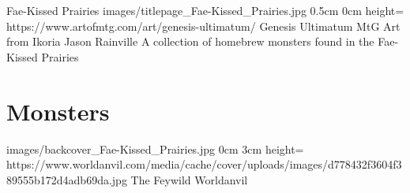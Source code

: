 \documentclass[letterpaper,openany,twoside,twocolumn]{book}
\begin{document}
	\bookTitlePage
		{Fae-Kissed Prairies}
		{images/titlepage_Fae-Kissed_Prairies.jpg}
		{0.5cm}
		{0cm}
		{height=\paperheight}
		{https://www.artofmtg.com/art/genesis-ultimatum/}
		{Genesis Ultimatum MtG Art from Ikoria}
		{Jason Rainville}
		{A collection of homebrew monsters found in the Fae-Kissed Prairies}
	
	\tableofcontents
	
	\mainmatter
	
	\MonsterSheetGeometry
	\part{Monsters}
	
	
	
	\bookLastPage
		{images/backcover_Fae-Kissed_Prairies.jpg}
		{0cm}
		{3cm}
		{height=\paperheight}
		{https://www.worldanvil.com/media/cache/cover/uploads/images/d778432f3604f389555b172d4adb69da.jpg}
		{The Feywild}
		{Worldanvil}
		{}
\end{document}
